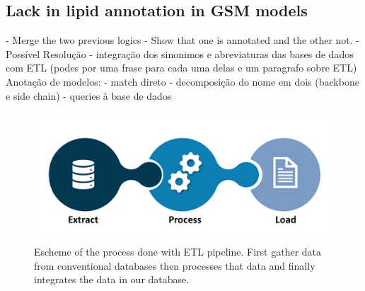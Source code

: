\documentclass{llncs}
\begin{document}
\subsection{Lack in lipid annotation in GSM models}

- Merge the two previous logics
- Show that one is annotated and the other not.
- Possível Resolução
    - integração dos sinonimos e abreviaturas das bases de dados com ETL (podes por uma frase para cada uma delas e um paragrafo sobre ETL)
    Anotação de modelos:
        - match direto
        - decomposição do nome em dois (backbone e side chain) - queries à base de dados
\begin{figure}
    \includegraphics[width=\textwidth]{imagens/ETL.png}
    \caption{Escheme of the process done with ETL pipeline.
    First gather data from conventional databases
    then processes that data
    and finally integrates the data in our database.} \label{fig2}    
\end{figure}







\end{document}

